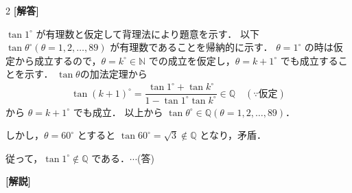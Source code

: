 \documentclass[../../main.tex]{subfiles}
\begin{document}
\setcounter{equation}{0}
\begin{oframed}
  
\end{oframed}
\setlength{\columnseprule}{0.4pt}
\begin{multicols}{2}
  {\bf [解答]}

  $\tan 1^\circ$ が有理数と仮定して背理法により題意を示す．
  以下 $\tan \theta^\circ (\theta=1,2,\dots,89)$ が有理数であることを帰納的に示す．
  $\theta=1^\circ$ の時は仮定から成立するので，$\theta=k^\circ \in \mathbb{N}$ での成立を仮定し，$\theta=k+1^\circ$ でも成立することを示す．
  $\tan\theta$の加法定理から
  \begin{align}
    \tan (k+1)^\circ
    = \dfrac{\tan 1^\circ + \tan k^\circ}{1 - \tan 1^\circ \tan k^\circ} \in \mathbb{Q} \quad (\because \text{仮定})
  \end{align}
  から $\theta=k+1^\circ$ でも成立．
  以上から $\tan \theta^\circ \in \mathbb{Q} (\theta=1,2,\dots,89)$．

  しかし，$\theta=60^\circ$ とすると $\tan 60^\circ = \sqrt{3} \notin \mathbb{Q}$ となり，矛盾．

  従って，$\tan 1^\circ \notin \mathbb{Q}$ である．$\cdots$(答)

  {\bf [解説]}

  \newpage
\end{multicols}
\end{document}
